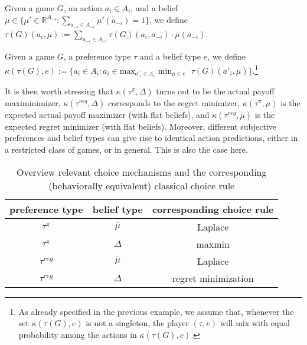 \documentclass[fleqn,reqno,11pt]{article}
\begin{document}
\begin{definition} \label{def:utility-belief}

Given a game $G$, an action $a_i \in A_i$, and a belief $\mu \in \lbrace \mu' \in \mathbb{R}^{A_{-i}}: \sum_{a_{-i} \in A_{-i}} \mu'(a_{-i}) = 1 \rbrace$, we define $\tau(G)(a_i, \mu):= \sum_{a_{-i} \in A_{-i}} \tau(G)(a_i, a_{-i}) \cdot \mu(a_{-i})$. 

\end{definition}

\begin{definition} \label{def:maxminSEU}

Given a game $G$, a preference type $\tau$ and a belief type $e$, we define $\kappa(\tau(G), e):= \lbrace a_i \in A_i : a_i \in \text{max}_{a'_i \in A_i} \text{ min}_{\mu \in e} \text{ } \tau(G)(a'_i, \mu) \rbrace$.\footnote{As already specified in the previous example, we assume that, whenever the set $\kappa(\tau(G), e)$ is not a singleton, the player $(\tau, e)$ will mix with equal probability among the actions in $\kappa(\tau(G), e)$.}

\end{definition}

It is then worth stressing that $\kappa(\tau^{\pi}, \Delta)$ turns out to be the actual payoff
maximinimizer, $\kappa(\tau^{reg}, \Delta)$ corresponds to the regret minimizer,
$\kappa(\tau^{\pi}, \overline{\mu})$ is the expected actual payoff maximizer (with flat beliefs), and
$\kappa(\tau^{reg}, \overline{\mu})$ is the expected regret minimizer (with flat beliefs).
Moreover, different subjective preferences and belief types can give rise to identical action predictions,
either in a restricted class of games, or in general. This is also the case here.

\begin{table}[t]
  \centering
  \begin{tabular}{ccc}
    preference type & belief type & corresponding choice rule \\ \midrule
    $\tau^\pi$ & $\overline{\mu}$ & Laplace \\
    $\tau^\pi$ & $\Delta$ & maxmin \\ 
    $\tau^{reg}$ & $\overline{\mu}$ & Laplace \\
    $\tau^{reg}$ & $\Delta$ & regret minimization \\ 
  \end{tabular}
  \caption{Overview relevant choice mechanisms and the corresponding (behaviorally equivalent) classical choice rule}
  \label{tab:CMs}
\end{table}
\end{document}
